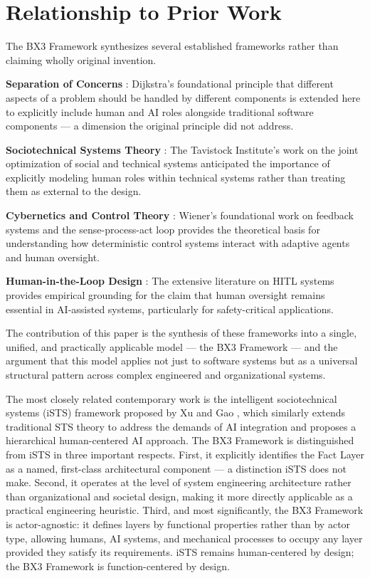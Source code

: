 \documentclass[12pt]{article}
\begin{document}
\section{Relationship to Prior Work}
\label{sec:priorwork}

The BX3 Framework synthesizes several established frameworks rather than claiming wholly original invention.

\textbf{Separation of Concerns} \cite{dijkstra1982}: Dijkstra's foundational principle that different aspects of a problem should be handled by different components is extended here to explicitly include human and AI roles alongside traditional software components --- a dimension the original principle did not address.

\textbf{Sociotechnical Systems Theory} \cite{trist1981}: The Tavistock Institute's work on the joint optimization of social and technical systems anticipated the importance of explicitly modeling human roles within technical systems rather than treating them as external to the design.

\textbf{Cybernetics and Control Theory} \cite{wiener1948}: Wiener's foundational work on feedback systems and the sense-process-act loop provides the theoretical basis for understanding how deterministic control systems interact with adaptive agents and human oversight.

\textbf{Human-in-the-Loop Design} \cite{bansal2019}: The extensive literature on HITL systems provides empirical grounding for the claim that human oversight remains essential in AI-assisted systems, particularly for safety-critical applications.

The contribution of this paper is the synthesis of these frameworks into a single, unified, and practically applicable model --- the BX3 Framework --- and the argument that this model applies not just to software systems but as a universal structural pattern across complex engineered and organizational systems.

The most closely related contemporary work is the intelligent sociotechnical systems (iSTS) framework proposed by Xu and Gao \cite{xu2024}, which similarly extends traditional STS theory to address the demands of AI integration and proposes a hierarchical human-centered AI approach. The BX3 Framework is distinguished from iSTS in three important respects. First, it explicitly identifies the Fact Layer as a named, first-class architectural component --- a distinction iSTS does not make. Second, it operates at the level of system engineering architecture rather than organizational and societal design, making it more directly applicable as a practical engineering heuristic. Third, and most significantly, the BX3 Framework is actor-agnostic: it defines layers by functional properties rather than by actor type, allowing humans, AI systems, and mechanical processes to occupy any layer provided they satisfy its requirements. iSTS remains human-centered by design; the BX3 Framework is function-centered by design.
\end{document}
